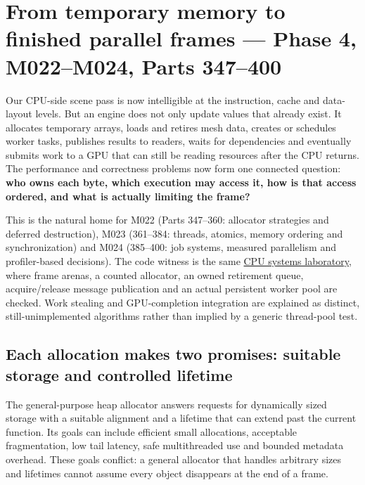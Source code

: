 \section{From temporary memory to finished parallel frames --- Phase 4, M022--M024, Parts 347--400}\label{05-engine-i-ch007-from-temporary-memory-to-finished-parallel-frames-phase-4-m022m024-parts-347400}

Our CPU-side scene pass is now intelligible at the instruction, cache and data-layout levels. But an engine does not only update values that already exist. It allocates temporary arrays, loads and retires mesh data, creates or schedules worker tasks, publishes results to readers, waits for dependencies and eventually submits work to a GPU that can still be reading resources after the CPU returns. The performance and correctness problems now form one connected question: \textbf{who owns each byte, which execution may access it, how is that access ordered, and what is actually limiting the frame?}

This is the natural home for M022 (Parts 347--360: allocator strategies and deferred destruction), M023 (361--384: threads, atomics, memory ordering and synchronization) and M024 (385--400: job systems, measured parallelism and profiler-based decisions). The code witness is the same \hyperref[source-file-0060a91bd24dd25d6c14e679]{CPU systems laboratory}, where frame arenas, a counted allocator, an owned retirement queue, acquire/release message publication and an actual persistent worker pool are checked. Work stealing and GPU-completion integration are explained as distinct, still-unimplemented algorithms rather than implied by a generic thread-pool test.

\subsection{Each allocation makes two promises: suitable storage and controlled lifetime}\label{05-engine-i-ch007-each-allocation-makes-two-promises-suitable-storage-and-controlled-lifetime}

The general-purpose heap allocator answers requests for dynamically sized storage with a suitable alignment and a lifetime that can extend past the current function. Its goals can include efficient small allocations, acceptable fragmentation, low tail latency, safe multithreaded use and bounded metadata overhead. These goals conflict: a general allocator that handles arbitrary sizes and lifetimes cannot assume every object disappears at the end of a frame.

